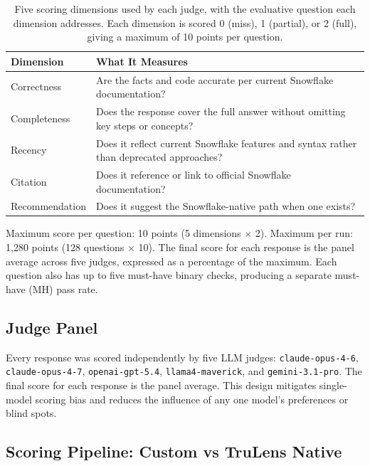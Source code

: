 \documentclass[10pt,letterpaper]{article}
\begin{document}
\begin{table}[tbp]
\caption{Five scoring dimensions used by each judge, with the evaluative question each dimension addresses. Each dimension is scored 0 (miss), 1 (partial), or 2 (full), giving a maximum of 10 points per question.}
\label{tab:scoring_rubric}
\small
\begin{tabularx}{\linewidth}{@{}l X@{}}
\toprule
\textbf{Dimension} & \textbf{What It Measures} \\
\midrule
Correctness     & Are the facts and code accurate per current Snowflake documentation? \\[3pt]
Completeness    & Does the response cover the full answer without omitting key steps or concepts? \\[3pt]
Recency         & Does it reflect current Snowflake features and syntax rather than deprecated approaches? \\[3pt]
Citation        & Does it reference or link to official Snowflake documentation? \\[3pt]
Recommendation  & Does it suggest the Snowflake-native path when one exists? \\
\bottomrule
\end{tabularx}
\end{table}

Maximum score per question: 10 points (5 dimensions $\times$ 2). Maximum per run: 1,280 points (128 questions $\times$ 10). The final score for each response is the panel average across five judges, expressed as a percentage of the maximum. Each question also has up to five must-have binary checks, producing a separate must-have (MH) pass rate.

\subsection{Judge Panel}

Every response was scored independently by five LLM judges: \texttt{claude-opus-4-6}, \texttt{claude-opus-4-7}, \texttt{openai-gpt-5.4}, \texttt{llama4-maverick}, and \texttt{gemini-3.1-pro}. The final score for each response is the panel average. This design mitigates single-model scoring bias and reduces the influence of any one model's preferences or blind spots.

\subsection{Scoring Pipeline: Custom vs TruLens Native}
\end{document}
